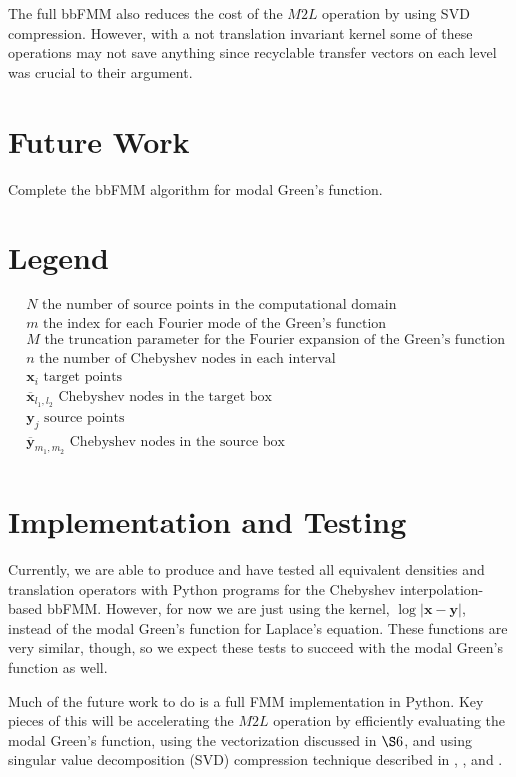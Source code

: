 \documentclass[11pt, oneside]{article}   	%
\begin{document}
The full bbFMM also reduces the cost of the $M2L$ operation by using SVD compression. However, with a not translation invariant kernel some of these operations may not save anything since recyclable transfer vectors on each level was crucial to their argument.

\section{Future Work}
Complete the bbFMM algorithm for modal Green's function.

\begin{appendices}
\section{Legend}
\begin{align*}
&N \mbox{ the number of source points in the computational domain}\\
&m \mbox{ the index for each Fourier mode of the Green's function}\\
&M \mbox{ the truncation parameter for the Fourier expansion of the Green's function}\\
&n \mbox{ the number of Chebyshev nodes in each interval}\\
&\mathbf{x}_i\mbox{ target points}\\
&\mathbf{\overline{x}}_{l_1,l_2}\mbox{ Chebyshev nodes in the target box}\\
&\mathbf{y}_j\mbox{ source points}\\
&\mathbf{\overline{y}}_{m_1,m_2}\mbox{ Chebyshev nodes in the source box}\\
\end{align*}


\section{Implementation and Testing}
Currently, we are able to produce and have tested all equivalent densities and translation operators with Python programs for the Chebyshev interpolation-based bbFMM. However, for now we are just using the kernel, $\log|\mathbf{x}-\mathbf{y}|$, instead of the modal Green's function for Laplace's equation. These functions are very similar, though, so we expect these tests to succeed with the modal Green's function as well.

Much of the future work to do is a full FMM implementation in Python. Key pieces of this will be accelerating the $M2L$ operation by efficiently evaluating the modal Green's function, using the vectorization discussed in $\S6$, and using singular value decomposition (SVD) compression technique described in \cite{CGMR}, \cite{FD}, \cite{ZGR} and \cite{MV}.


\end{appendices}
\end{document}
